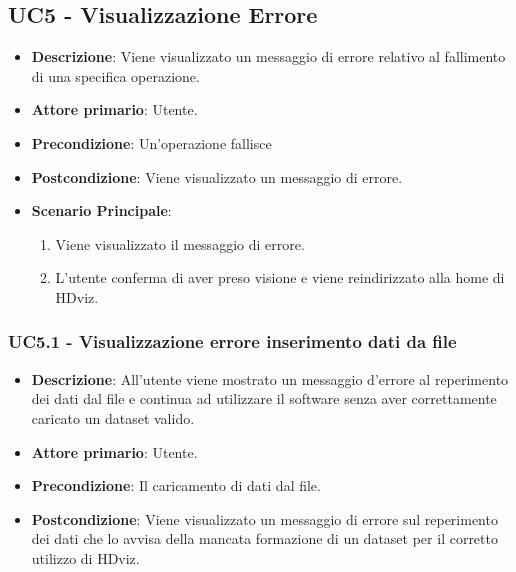 \newpage
\subsection{UC5 - Visualizzazione Errore}
\label{subsec:uc5}

\begin{itemize}
    \item \textbf{Descrizione}: Viene visualizzato un messaggio di errore relativo al fallimento di una specifica operazione.

    \item \textbf{Attore primario}: Utente.
    
    \item \textbf{Precondizione}:   Un'operazione fallisce

    \item \textbf{Postcondizione}:  Viene visualizzato un messaggio di errore.
    
    \item \textbf{Scenario Principale}:
    \begin{enumerate}
        \item Viene visualizzato il messaggio di errore.
        \item L'utente conferma di aver preso visione e viene reindirizzato alla home di HDviz.
    \end{enumerate}

\end{itemize}


\subsubsection{UC5.1 - Visualizzazione errore inserimento dati da file}
\label{subsec:uc5.1.1}
\begin{itemize}
    \item \textbf{Descrizione}: All'utente viene mostrato un messaggio d'errore al reperimento
                                dei dati dal file e continua ad utilizzare 
                                il software senza aver correttamente caricato un dataset valido.

    \item \textbf{Attore primario}: Utente.
    
    \item \textbf{Precondizione}:   Il caricamento di dati dal file.

    \item \textbf{Postcondizione}:  Viene visualizzato un messaggio di errore sul reperimento dei 
                                    dati che lo avvisa della mancata formazione di un dataset per il
                                    corretto utilizzo di HDviz.

\end{itemize}


